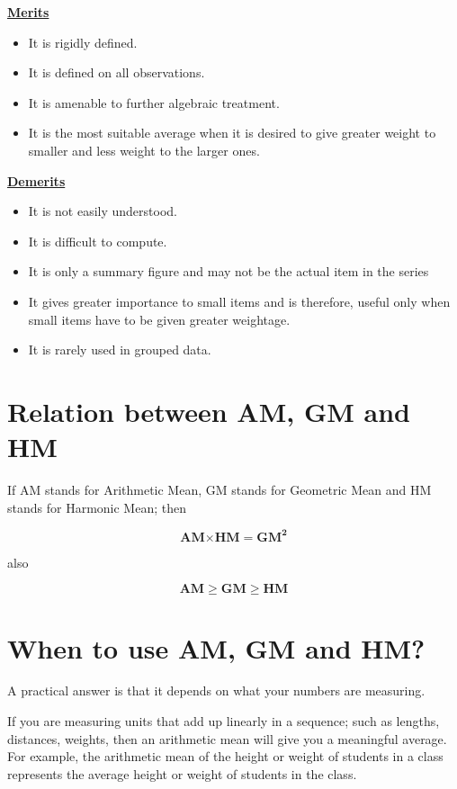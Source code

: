 \documentclass[
]{book}
\begin{document}
\underline{\textbf{Merits}}

\begin{itemize}
\item
  It is rigidly defined.
\item
  It is defined on all observations.
\item
  It is amenable to further algebraic treatment.
\item
  It is the most suitable average when it is desired to give greater
  weight to smaller and less weight to the larger ones.
\end{itemize}

\underline{\textbf{Demerits}}

\begin{itemize}
\item
  It is not easily understood.
\item
  It is difficult to compute.
\item
  It is only a summary figure and may not be the actual item in the
  series
\item
  It gives greater importance to small items and is therefore, useful
  only when small items have to be given greater weightage.
\item
  It is rarely used in grouped data.
\end{itemize}

\hypertarget{relation-between-am-gm-and-hm}{%
\section{Relation between AM, GM and HM}\label{relation-between-am-gm-and-hm}}

If AM stands for Arithmetic Mean, GM stands for Geometric Mean and HM
stands for Harmonic Mean; then

\[\mathbf{\text{AM}}\mathbf{\times}\mathbf{\text{HM}}\mathbf{=}\mathbf{\text{GM}}^{\mathbf{2}}\]

also

\[\mathbf{AM \geq GM \geq HM}\]

\hypertarget{when-to-use-am-gm-and-hm}{%
\section{When to use AM, GM and HM?}\label{when-to-use-am-gm-and-hm}}

A practical answer is that it depends on what your numbers are
measuring.

If you are measuring units that add up linearly in a sequence; such as
lengths, distances, weights, then an arithmetic mean will give you a
meaningful average. For example, the arithmetic mean of the height or
weight of students in a class represents the average height or weight of
students in the class.
\end{document}
